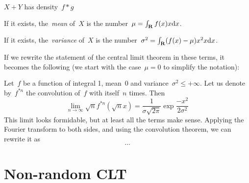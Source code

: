 $X+Y$ has density~$f*g$

If it exists, the~\emph{mean} of~$X$ is the number~$\mu=\int_{\mathbf{R}}f(x)x\mathrm{d}x$.

If it exists, the~\emph{variance} of~$X$ is the
number~$\sigma^2=\int_{\mathbf{R}}(f(x)-\mu)x^2x\mathrm{d}x$.

If we rewrite the statement of the central limit theorem in these
terms, it becomes the following (we start with the case~$\mu=0$ to
simplify the notation):

Let~$f$ be a function of integral 1, mean~$0$ and
variance~$\sigma^2\le+\infty$.  Let us denote by~$f^{*n}$ the
convolution of~$f$ with itself~$n$ times.  Then
\[
	\lim_{n\to\infty}
	\sqrt{n}f^{*n}\left(\sqrt{n}x\right)
	=
	\frac1{\sigma\sqrt{2\pi}}\exp\frac{-x^2}{2\sigma^2}
\]
This limit looks formidable, but at least all the terms make sense.
Applying the Fourier transform to both sides, and using the
convolution theorem, we can rewrite it as
\[
	\ldots
\]





\section{Non-random CLT}

